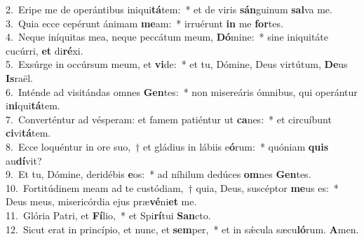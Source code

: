 {2.~}Eripe me de operántibus iniqui\textbf{tá}tem:~* et de viris \textbf{sán}guinum \textbf{sal}va me.\\
{3.~}Quia ecce cepérunt ánimam \textbf{me}am:~* irruérunt \textbf{in} me \textbf{for}tes.\\
{4.~}Neque iníquitas mea, neque peccátum meum, \textbf{Dó}mine:~* sine iniquitáte cucúrri, \textbf{et} di\textbf{ré}xi.\\
{5.~}Exsúrge in occúrsum meum, et \textbf{vi}de:~* et tu, Dómine, Deus virtútum, \textbf{De}us \textbf{Is}raël.\\
{6.~}Inténde ad visitándas omnes \textbf{Gen}tes:~* non misereáris ómnibus, qui operántur i\textbf{ni}qui\textbf{tá}tem.\\
{7.~}Converténtur ad vésperam: et famem patiéntur ut \textbf{ca}nes:~* et circuíbunt \textbf{ci}vi\textbf{tá}tem.\\
{8.~}Ecce loquéntur in ore suo,~† et gládius in lábiis e\textbf{ó}rum:~* quóniam \textbf{quis} au\textbf{dí}vit?\\
{9.~}Et tu, Dómine, deridébis \textbf{e}os:~* ad níhilum dedúces \textbf{om}nes \textbf{Gen}tes.\\
{10.~}Fortitúdinem meam ad te custódiam,~† quia, Deus, suscéptor \textbf{me}us es:~* Deus meus, misericórdia ejus præ\textbf{vé}ni\textbf{et} me.\\
{11.~}Glória Patri, et \textbf{Fí}lio,~* et Spi\textbf{rí}tui \textbf{San}cto.\\
{12.~}Sicut erat in princípio, et nunc, et \textbf{sem}per,~* et in sǽcula sæcu\textbf{ló}rum. \textbf{A}men.\\
